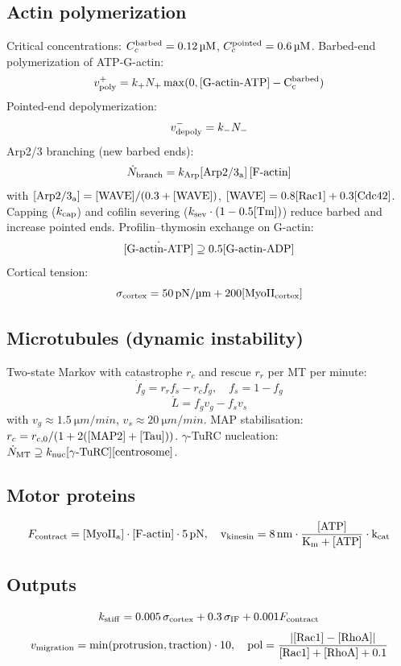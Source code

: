 \documentclass[11pt,a4paper]{article}
\newcommand{\eq}[1]{\begin{equation}#1\end{equation}}
\begin{document}
\subsection{Actin polymerization}
Critical concentrations: $C_c^{\rm barbed}=\SI{0.12}{\micro M}$, $C_c^{\rm pointed}=\SI{0.6}{\micro M}$.
Barbed-end polymerization of ATP-G-actin:
\eq{ v_{\rm poly}^+ = k_+ N_+ \max(0,[\rm G\text{-}actin\text{-}ATP] - C_c^{\rm barbed}) }
Pointed-end depolymerization:
\eq{ v_{\rm depoly}^- = k_- N_- }
Arp2/3 branching (new barbed ends):
\eq{ \dot N_{\rm branch} = k_{\rm Arp}[\rm Arp2/3_a]\,[\rm F\text{-}actin] }
with $[\rm Arp2/3_a]=[\rm WAVE]/(0.3+[\rm WAVE])$, $[\rm WAVE]=0.8[\rm Rac1]+0.3[\rm Cdc42]$.
Capping ($k_{\rm cap}$) and cofilin severing ($k_{\rm sev}\cdot(1-0.5[\rm Tm])$) reduce barbed and increase pointed ends.
Profilin--thymosin exchange on G-actin:
\eq{ \dot{[\rm G\text{-}actin\text{-}ATP]}\supseteq 0.5[\rm G\text{-}actin\text{-}ADP] }
Cortical tension:
\eq{ \sigma_{\rm cortex}=\SI{50}{pN/\micro m}+200[\rm MyoII_{cortex}] }

\subsection{Microtubules (dynamic instability)}
Two-state Markov with catastrophe $r_c$ and rescue $r_r$ per MT per minute:
\eq{ \dot f_g = r_r f_s - r_c f_g,\quad f_s=1-f_g }
\eq{ \dot L = f_g v_g - f_s v_s }
with $v_g\approx\SI{1.5}{\micro m/min}$, $v_s\approx\SI{20}{\micro m/min}$.
MAP stabilisation: $r_c = r_{c,0}/(1+2([\rm MAP2]+[\rm Tau]))$.
$\gamma$-TuRC nucleation: $\dot N_{\rm MT}\supseteq k_{\rm nuc}[\gamma\text{-TuRC}][\rm centrosome]$.

\subsection{Motor proteins}
\eq{ F_{\rm contract}= [\rm MyoII_a]\cdot[\rm F\text{-}actin]\cdot 5\,\si{pN},\quad v_{\rm kinesin}=\SI{8}{nm}\cdot\frac{[\rm ATP]}{K_m+[\rm ATP]}\cdot k_{\rm cat} }

\subsection{Outputs}
\eq{ k_{\rm stiff}=0.005\,\sigma_{\rm cortex}+0.3\,\sigma_{\rm IF}+0.001 F_{\rm contract} }
\eq{ v_{\rm migration}=\min(\mathrm{protrusion},\mathrm{traction})\cdot 10,\quad \mathrm{pol}=\frac{|[\rm Rac1]-[\rm RhoA]|}{[\rm Rac1]+[\rm RhoA]+0.1} }
\end{document}
